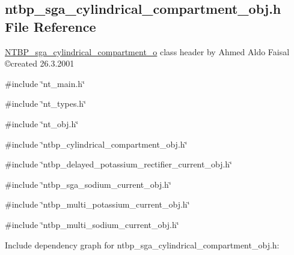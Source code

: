 \subsection{ntbp\_\-sga\_\-cylindrical\_\-compartment\_\-obj.h File Reference}
\label{ntbp__sga__cylindrical__compartment__obj_8h}



\begin{DoxyItemize}
\item \hyperlink{class_n_t_b_p__sga__cylindrical__compartment__o}{NTBP\_\-sga\_\-cylindrical\_\-compartment\_\-o} class header by Ahmed Aldo Faisal \copyright created 26.3.2001 
\end{DoxyItemize} 


{\ttfamily \#include \char`\"{}nt\_\-main.h\char`\"{}}\par
{\ttfamily \#include \char`\"{}nt\_\-types.h\char`\"{}}\par
{\ttfamily \#include \char`\"{}nt\_\-obj.h\char`\"{}}\par
{\ttfamily \#include \char`\"{}ntbp\_\-cylindrical\_\-compartment\_\-obj.h\char`\"{}}\par
{\ttfamily \#include \char`\"{}ntbp\_\-delayed\_\-potassium\_\-rectifier\_\-current\_\-obj.h\char`\"{}}\par
{\ttfamily \#include \char`\"{}ntbp\_\-sga\_\-sodium\_\-current\_\-obj.h\char`\"{}}\par
{\ttfamily \#include \char`\"{}ntbp\_\-multi\_\-potassium\_\-current\_\-obj.h\char`\"{}}\par
{\ttfamily \#include \char`\"{}ntbp\_\-multi\_\-sodium\_\-current\_\-obj.h\char`\"{}}\par
Include dependency graph for ntbp\_\-sga\_\-cylindrical\_\-compartment\_\-obj.h:
\nopagebreak
